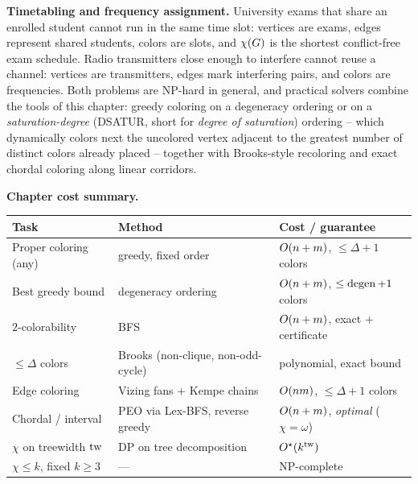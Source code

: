 \begin{applicationbox}
\textbf{Timetabling and frequency assignment.} University exams that share an enrolled student cannot run
in the same time slot: vertices are exams, edges represent shared students, colors are slots, and $\chi(G)$ is the shortest conflict-free exam schedule. Radio transmitters close enough to interfere cannot reuse a channel: vertices are transmitters, edges mark interfering
pairs, and colors are frequencies. Both problems are NP-hard in general, and practical solvers combine the tools of this chapter: greedy coloring on a degeneracy ordering or on a \emph{saturation-degree} (\textsc{DSATUR}, short for \emph{degree of saturation}) ordering -- which dynamically colors next the uncolored vertex adjacent to the greatest number of distinct colors already placed -- together with Brooks-style recoloring and exact chordal coloring along linear corridors.
\end{applicationbox}

\begin{complexitybox}
\textbf{Chapter cost summary.}
\begin{center}
\small
\begin{tabular}{lll}
\toprule
Task & Method & Cost / guarantee\\
\midrule
Proper coloring (any) & greedy, fixed order & $O(n+m)$, $\le\Delta+1$ colors\\
Best greedy bound & degeneracy ordering & $O(n+m)$, $\le\operatorname{degen}+1$ colors\\
$2$-colorability & BFS & $O(n+m)$, exact + certificate\\
$\le\Delta$ colors & Brooks (non-clique, non-odd-cycle) & polynomial, exact bound\\
Edge coloring & Vizing fans + Kempe chains & $O(nm)$, $\le\Delta+1$ colors\\
Chordal / interval & PEO via Lex-BFS, reverse greedy & $O(n+m)$, \emph{optimal} ($\chi=\omega$)\\
$\chi$ on treewidth $\operatorname{tw}$ & DP on tree decomposition & $O^\star(k^{\operatorname{tw}})$\\
$\chi\le k$, fixed $k\ge 3$ & --- & NP-complete\\
\bottomrule
\end{tabular}
\end{center}
\end{complexitybox}

